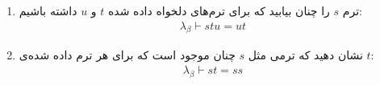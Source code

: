 \begin{enumerate}[label=\textbf{(\textit{\alph*})}]
    \item ترم $s$ را چنان بیابید که برای ترم‌های دلخواه داده شده $t$ و $u$ داشته باشیم:
        \begin{gather*}
            \lambda_\beta \vdash stu = ut
        \end{gather*}
    \item نشان دهید که ترمی مثل $s$ چنان موجود است که برای هر ترم داده شده‌ی $t$:
        \begin{gather*}
            \lambda_\beta \vdash st = ss
        \end{gather*}
\end{enumerate}